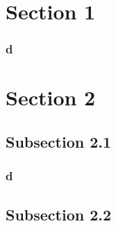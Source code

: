 \documentclass{beamer}
\begin{document}
\section{Section 1}
\begin{frame}

\end{frame}

\begin{frame}
    \frametitle{d}
\end{frame}


\section{Section 2}
\subsection{Subsection 2.1}
\begin{frame}
    \frametitle{d}

\end{frame}

\subsection{Subsection 2.2}
\begin{frame}

\end{frame}
\end{document}
